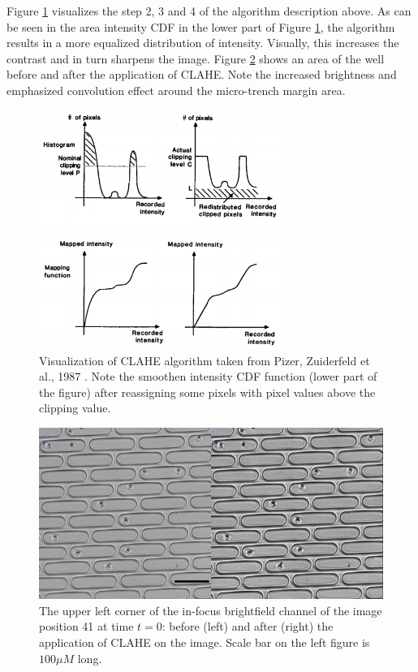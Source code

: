 \documentclass[pdftex,12pt,a4paper]{report}
\begin{document}
Figure \ref{fig:clahe} visualizes the step 2, 3 and 4 of the algorithm description above. As can be seen in the area intensity CDF in the lower part of Figure \ref{fig:clahe}, the algorithm results in a more equalized distribution of intensity. Visually, this increases the contrast and in turn sharpens the image. Figure \ref{fig:clahe_before_after} shows an area of the well before and after the application of CLAHE. Note the increased brightness and emphasized convolution effect around the micro-trench margin area.

\begin{figure}[H]
\centering
\includegraphics[width=0.7\textwidth]{images/clahe}
\caption[Visualizatoin of CLAHE algorithm]{Visualization of CLAHE algorithm taken from Pizer, Zuiderfeld et al., 1987 \cite{pizer1987adaptive}. Note the  smoothen intensity CDF function (lower part of the figure) after reassigning some pixels with pixel values above the clipping value.}
\label{fig:clahe}
\end{figure}

\begin{figure}[H]
\centering
\includegraphics[width=\textwidth]{images/clahe_before_after}
\caption[Example of application of CLAHE algorithm]{The upper left corner of the in-focus brightfield channel of the image position 41 at time $t=0$: before (left) and after (right) the application of CLAHE on the image. Scale bar on the left figure is $100 \mu M$ long.}
\label{fig:clahe_before_after}
\end{figure}
\end{document}
